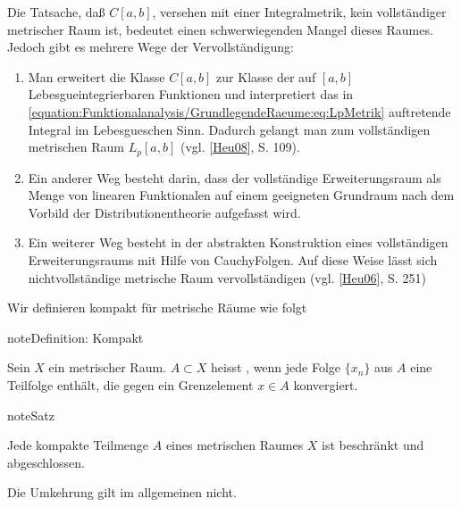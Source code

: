 \documentclass[letterpaper,10pt,english]{jupyterBook}
\begin{document}
Die Tatsache, daß \(C[a,b]\), versehen mit einer Integralmetrik, kein vollständiger metrischer Raum ist, bedeutet einen schwerwiegenden Mangel dieses Raumes. Jedoch gibt es mehrere Wege der Vervollständigung:
\begin{enumerate}
%
\item {} 
Man erweitert die Klasse \(C[a,b]\) zur Klasse der auf \([a,b]\) Lebesgue\sphinxhyphen{}integrierbaren Funktionen und interpretiert das in \eqref{equation:Funktionalanalysis/GrundlegendeRaeume:eq:LpMetrik} auftretende Integral im Lebesgueschen Sinn. Dadurch gelangt man zum vollständigen metrischen Raum \(L_p[a, b]\) (vgl. {[}\hyperlink{cite.Appendix:id4}{Heu08}{]}, S. 109).

\item {} 
Ein anderer Weg besteht darin, dass der vollständige Erweiterungsraum als Menge von linearen Funktionalen auf einem geeigneten Grundraum nach dem Vorbild der Distributionentheorie aufgefasst wird.

\item {} 
Ein weiterer Weg besteht in der abstrakten Konstruktion eines vollständigen Erweiterungsraums mit Hilfe von Cauchy\sphinxhyphen{}Folgen. Auf diese Weise lässt sich  nichtvollständige metrische Raum vervollständigen (vgl. {[}\hyperlink{cite.Appendix:id5}{Heu06}{]}, S. 251)

\end{enumerate}

Wir definieren kompakt für metrische Räume wie folgt

\begin{sphinxadmonition}{note}{Definition: Kompakt}

Sein \(X\) ein metrischer Raum. \(A \subset X\) heisst , wenn jede Folge \(\{x_n\}\) aus \(A\) eine Teilfolge enthält, die gegen ein Grenzelement \(x\in A\) konvergiert.
\end{sphinxadmonition}

\begin{sphinxadmonition}{note}{Satz}

Jede kompakte Teilmenge \(A\) eines metrischen Raumes \(X\) ist beschränkt und abgeschlossen.
\end{sphinxadmonition}

Die Umkehrung gilt im allgemeinen nicht.
\end{document}
